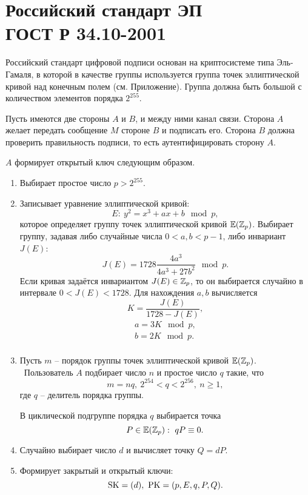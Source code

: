 \section[Российский стандарт ЭП ГОСТ Р 34.10-2001]{Российский стандарт ЭП \protect\\ ГОСТ Р 34.10-2001}

Российский стандарт цифровой подписи основан на криптосистеме типа Эль-Гамаля, в которой в качестве группы используется группа точек эллиптической кривой над конечным полем (см. Приложение). Группа должна быть большой с количеством элементов порядка $2^{255}$.

Пусть имеются две стороны $A$ и $B$, и между ними канал связи. Сторона $A$ желает передать сообщение $M$ стороне $B$ и подписать его. Сторона $B$ должна проверить правильность подписи, то есть аутентифицировать сторону $A$.

$A$ формирует открытый ключ следующим образом.

\begin{enumerate}
    \item Выбирает простое число $p > 2^{255}$.
    \item Записывает уравнение эллиптической кривой:
        \[ E: ~ y^2 = x^3 + a x + b \mod p, \]
        которое определяет группу точек эллиптической кривой $\mathbb{E}(\mathbb{Z}_p)$.
        Выбирает группу, задавая либо случайные числа $0 < a, b < p-1$, либо инвариант $J(E)$:
        \[ J(E) = 1728 \frac{4 a^3}{4 a^3 + 27 b^2} \mod p. \]
        Если кривая задаётся инвариантом $J(E) \in \mathbb{Z}_p$, то он выбирается случайно в интервале $0 < J(E) < 1728$. Для нахождения $a,b$ вычисляется
        \[ K = \frac{J(E)}{1728 - J(E)}, \]
        \[ \begin{array}{l}
            a = 3 K \mod p, \\
            b = 2 K \mod p. \\
        \end{array} \]
    \item Пусть $m$ -- порядок группы точек эллиптической кривой $\mathbb{E}(\mathbb{Z}_p)$. ~Пользователь $A$ подбирает число $n$ и простое число $q$ такие, что
        \[ m = n q, ~ 2^{254} < q < 2^{256}, ~ n \geq 1, \]
        где $q$ -- делитель порядка группы.

        В циклической подгруппе порядка $q$ выбирается точка
        \[ P \in \mathbb{E}(\mathbb{Z}_p): ~ q P \equiv 0. \]
    \item Случайно выбирает число $d$ и вычисляет точку $Q = d P$.
    \item Формирует закрытый и открытый ключи:
        \[ \textrm{SK} = (d), ~ \textrm{PK} = (p, E, q, P, Q). \]
\end{enumerate}

